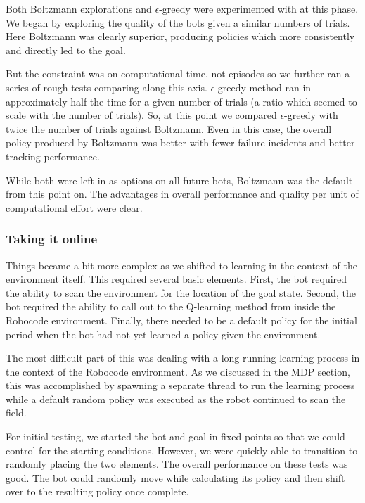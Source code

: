 \documentclass{aiaa-tc}%
\begin{document}
Both Boltzmann explorations and $\epsilon$-greedy were experimented
with at this phase.  We began by exploring the quality of the bots
given a similar numbers of trials. Here Boltzmann was clearly
superior, producing policies which more consistently and directly led
to the goal.

But the constraint was on computational time, not episodes so we
further ran a series of rough tests comparing along this axis. $\epsilon$-greedy method ran in approximately half the
time for a given number of trials (a ratio which seemed to scale with
the number of trials). So, at this point we compared $\epsilon$-greedy
with twice the number of trials against Boltzmann. Even in this case,
the overall policy produced by Boltzmann was better with fewer failure
incidents and better tracking performance.

While both were left in as options on all future
bots, Boltzmann was the default from this point on. The advantages in
overall performance and quality per unit of computational effort were
clear.

\subsubsection{Taking it online}

Things became a bit more complex as we shifted to
learning in the context of the environment itself. This required
several basic elements. First, the bot required the ability to scan
the environment for the location of the goal state. Second, the bot
required the ability to call out to the Q-learning method from inside
the Robocode environment. Finally, there needed to be a default policy
for the initial period when the bot had not yet learned a policy given
the environment. 

The most difficult part of this was dealing with a long-running
learning process in the context of the Robocode environment. As we
discussed in the MDP section, this was accomplished by spawning a
separate thread to run the learning process while a default random
policy was executed as the robot continued to scan the field.

For initial testing, we started the bot and goal in fixed points so
that we could control for the starting conditions. However, we were
quickly able to transition to randomly placing the two elements. The overall
performance on these tests was good. The bot could randomly move while
calculating its policy and then shift over to the resulting policy
once complete.
\end{document}
